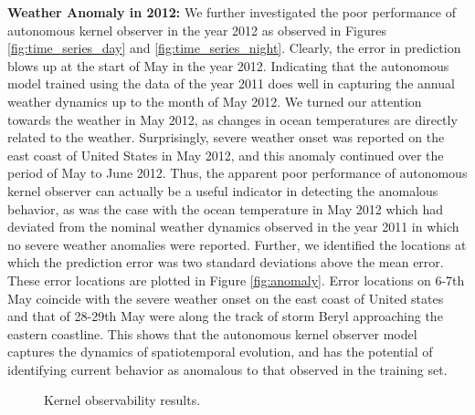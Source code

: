  \textbf{Weather Anomaly in 2012:} We further investigated the poor performance of autonomous kernel observer in the year 2012 as observed in Figures \ref{fig:time_series_day} and \ref{fig:time_series_night}. Clearly, the error in prediction blows up at the start of May in the year 2012. Indicating that the autonomous model trained using the data of the year 2011 does well in capturing the annual weather dynamics up to the month of May 2012. We turned our attention towards the weather in May 2012, as changes in ocean temperatures are directly related to the weather. Surprisingly, severe weather onset was reported on the east coast of United States in May 2012, and this anomaly continued over the period of May to June 2012. Thus, the apparent poor performance of autonomous kernel observer can actually be a useful indicator in detecting the anomalous behavior, as was the case with the ocean temperature in May 2012 which had deviated from the nominal weather dynamics observed in the year 2011 in which no severe weather anomalies were reported. Further, we identified the locations at which the prediction error was two standard deviations above the mean error. These error locations are plotted in Figure \ref{fig:anomaly}. Error locations on 6-7th May coincide with the severe weather onset on the east coast of United states and that of 28-29th May were along the track of storm Beryl approaching the eastern coastline. This shows that the autonomous kernel observer model captures the dynamics of spatiotemporal evolution, and has the potential of identifying current behavior as anomalous to that observed in the training set.
 
\begin{figure}
\centering
    \caption{Kernel observability results.}
\end{figure} 

